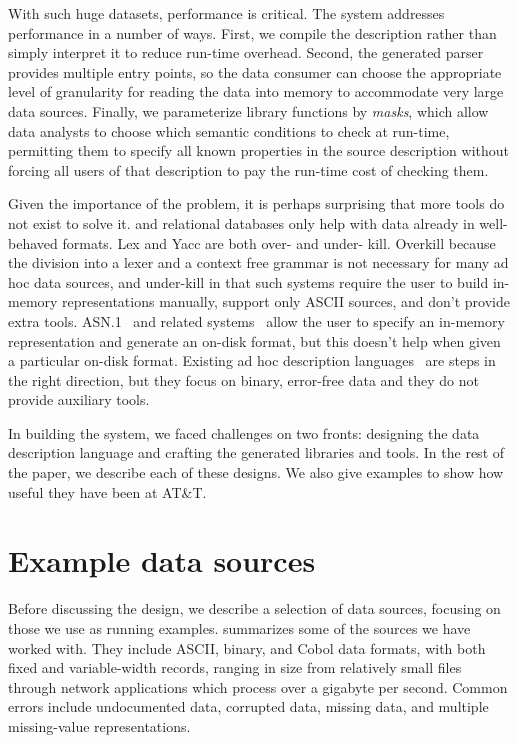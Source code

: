 \documentclass[times]{acm-sigplan}
\begin{document}
With such huge datasets, performance is critical. The \pads{} system addresses performance in a number of ways.
First, we compile the \pads{} description rather than simply interpret it to reduce run-time overhead.
Second, the generated parser provides  multiple entry points, so the data consumer can choose 
the appropriate level of granularity for reading the data into memory to accommodate very large data sources.
Finally, we parameterize library functions by \textit{masks}, which allow data analysts to 
choose which semantic conditions to check at run-time, permitting them to specify
all known properties in the source description without forcing all users of that 
description to pay the run-time cost of checking them.  

Given the importance of the problem, it is perhaps surprising
that more tools do not exist to solve it.  \xml{} and relational databases
only help with data already in well-behaved formats.  Lex and Yacc are both
over- and under- kill.  Overkill because the division into a lexer and a context free grammar is not necessary for many ad hoc data sources, and under-kill in that such systems require the user to build in-memory representations manually,
support only ASCII sources, and don't provide extra tools.  ASN.1~\cite{asn} and related systems~\cite{asdl} allow the user to specify an in-memory representation and generate an on-disk format, but this doesn't help when given a particular on-disk format.  
Existing ad hoc description languages~\cite{gpce02,sigcomm00,erlang} are steps 
in the right direction, but they focus on binary, error-free data and they do not provide auxiliary tools.

In building the \pads{} system, we faced challenges on two fronts:
designing the data description language and
crafting the generated libraries and tools.
In the rest of the paper, 
we describe each of these designs.
We also give examples to show how useful they have been at AT\&T.


\section{Example data sources}

Before discussing the \pads{} design, we describe a selection of data
sources, focusing on those we use as running examples.
 summarizes some of the sources we have
worked with.  They include ASCII, binary, and Cobol data formats, with
both fixed and variable-width records, ranging in size from
relatively small files through network applications which process over
a gigabyte per second.  Common errors include undocumented data,
corrupted data, missing data, and multiple missing-value
representations.
\end{document}
